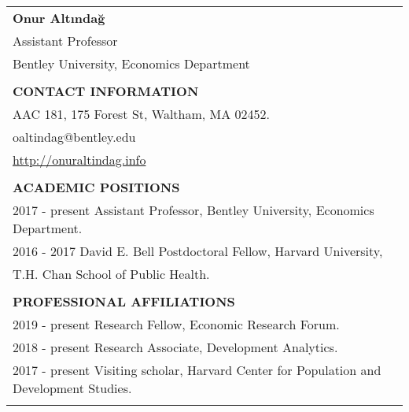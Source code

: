 \documentclass[12 pt]{article}
\begin{document}
\begin{longtable}{ccccc}



\multicolumn{5}{l}{\Large{\textbf{Onur Alt{\i}nda\u{g}}}}     \\


\multicolumn{5}{l}{Assistant Professor}    \\
\multicolumn{5}{l}{Bentley University, Economics Department}    \\
\\
\multicolumn{5}{l}{\textbf{CONTACT INFORMATION}} \\[2 pt]
\multicolumn{5}{l}{AAC 181, 175 Forest St, Waltham, MA 02452.}    \\
\multicolumn{5}{l}{oaltindag@bentley.edu}   \\
\multicolumn{5}{l}{\url{http://onuraltindag.info}}   \\



\\
\multicolumn{5}{l}{\textbf{ACADEMIC POSITIONS}}  \\[2 pt]
 \multicolumn{4}{l}{2017 - present \phantom{00} Assistant Professor, Bentley University, Economics Department.}  \\
 \multicolumn{4}{l}{2016 - 2017 \phantom{0000} David E. Bell Postdoctoral Fellow, Harvard University,}  \\
  \multicolumn{4}{l}{\phantom{2016 - 2017} \phantom{0000}  T.H. Chan School of Public Health.}  \\

\\

 \multicolumn{5}{l}{\textbf{PROFESSIONAL AFFILIATIONS}}  \\[2 pt]


   \multicolumn{4}{l}{2019 - present \phantom{00}Research Fellow, Economic Research Forum.}  \\



  \multicolumn{4}{l}{2018 - present \phantom{00}Research Associate, Development Analytics.}  \\
   \multicolumn{4}{l}{2017 - present \phantom{00}Visiting scholar, Harvard Center for Population and Development Studies.} \\ 

\\



\end{longtable}
\end{document}
